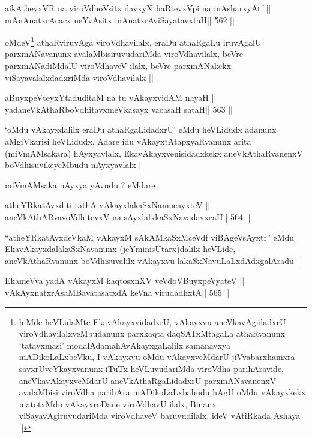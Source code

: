 \begin{shl}
aikAtheyxVR na viroVdhoV\s sitx davxyXthaRtevxV\s pi na mAsharxyAtf ||
mAnAnatxrAcacx neYvAsitx mAnatxrAviSayatavxtaH\hfill || 562 ||
\end{shl}

\begin{artha}
oMdeV\footnote[1]{hiMde heVLidaMte EkavAkayxvidadxrU, vAkayxvu
  aneVkavAgidadxrU viroVdhavilalxveMbudanunx parxkaqta daqSATxMtagaLa
  athaRvanunx `tatavxmasi' modalAdamahAvAkayxgaLalilx samanavxya
  mADikoLaLxbeVku, I vAkayxvu oMdu vAkayxveMdarU jiVvabarxhamxra
  savxrUveYkayxvanunx iTuTx heVLuvudariMda viroVdha parihAravide,
  aneVkavAkayxveMdarU aneVkAthaRgaLidadxrU parxmANavanenxV avalaMbisi
  viroVdha parihAra mADikoLaLxbahudu hAgU oMdu vAkayxkekx matotxMdu
  vAkayxroDane viroVdhavU ilalx, Binanx viSayavAgiruvudariMda
  viroVdhaveV baruvudilalx. ideV vAtiRkada Ashaya ||} athaRviruvAga viroVdhavilalx, eraDu athaRgaLu iruvAgalU
parxmANavanunx avalaMbisiruvudariMda viroVdhavilalx, beVre
parxmANadiMdalU viroVdhaveV ilalx, beVre parxmANakekx
viSayavalalxdadxriMda viroVdhavilalx ||
\end{artha}

\begin{shl}
aBuyxpeVteyxYtaduditaM na tu vAkayxvidAM nayaH ||
yadaneVkAthaRboVdhitavxmeVkasayx vacasaH sataH\hfill || 563 ||
\end{shl}

\begin{artha}
`oMdu vAkayxdalilx eraDu athaRgaLidadxrU' eMdu heVLidudx adanunx
  aMgiVkarisi heVLidudx, Adare idu vAkayxtAtapxyaRvanunx arita
  (miVmAMsakara) hAyxyavlalx, EkavAkayxvenisidadxkekx
  aneVkAthaRvanenxV boVdhisuvikeyeMbudu nAyxyavlalx |

miVmAMsaka nAyxya yAvudu ? eMdare
\end{artha}

\begin{shl}
atheYRkatAvxditi tathA vAkayxlakaSxNamucayxteV ||
aneVkAthARvavoVdhitevxV na sAyxlalxkaSxNavadavxcaH\hfill || 564 ||
\end{shl}

\begin{artha}
``atheYRkatAvxdeVkaM vAkayxM sAkAMkaSxMceVdf viBAgeVsAyxtf'' eMdu
  EkavAkayxdalakaSxNavanunx (jeYminisUtarx)dalilx heVLide,
  aneVkAthaRvanunx boVdhisuvalilx vAkayxvu lakaSxNavuLaLxdAdxgalAradu |
\end{artha}

\begin{shl}
EkameVva yadA vAkayxM kaqtosxnXV veVdoV\s BuyxpeVyateV ||
vAkAyxnatxrAsaMBavatasatxdA keVna virudadhxtA\hfill || 565 ||
\end{shl}

